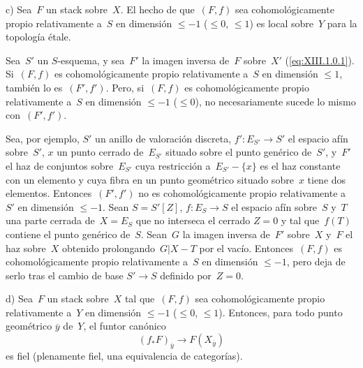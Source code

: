 \begin{remarques}
c) Sea~$F$ un stack sobre~$X$. El hecho de que~$(F,f)$ sea
cohomológicamente propio relativamente a~$S$ en dimensión
$\leqslant -1$ (\resp $\leqslant 0$, \resp $\leqslant 1$) es local
sobre~$Y$ para la topología étale.

Sea~$S'$ un $S$-esquema, y sea~$F'$ la imagen inversa de~$F$ sobre~$X'$
(\cf \eqref{eq:XIII.1.0.1}). Si~$(F,f)$ es cohomológicamente propio
relativamente a~$S$ en dimensión $\leqslant 1$, también lo es~$(F',f')$.
Pero, si~$(F,f)$ es cohomológicamente propio relativamente a~$S$ en
dimensión $\leqslant -1$ (\resp $\leqslant 0$), no necesariamente sucede
lo mismo con~$(F',f')$.

Sea, por ejemplo, $S'$ un anillo de valoración discreta,
$f'\colon E_{S'}\to S'$ el espacio afín sobre~$S'$, $x$ un punto cerrado
de~$E_{S'}$ situado sobre el punto genérico de~$S'$, y~$F'$ el haz de
conjuntos sobre~$E_{S'}$ cuya restricción a~$E_{S'}-\{x\}$ es el haz
constante con un elemento y cuya fibra en un punto geométrico situado
sobre~$x$ tiene dos elementos. Entonces~$(F',f')$ no es
cohomológicamente propio relativamente a~$S'$ en dimensión
$\leqslant -1$. Sean $S=S'[Z]$, $f\colon E_S\to S$ el espacio afín
sobre~$S$ y~$T$ una parte cerrada de~$X=E_S$ que no interseca el cerrado
$Z=0$ y tal que~$f(T)$ contiene el punto genérico de~$S$.
Sean~$G$ la imagen inversa de~$F'$ sobre~$X$ y~$F$ el haz sobre~$X$
obtenido prolongando~$G|X-T$ por el vacío. Entonces~$(F,f)$ es
cohomológicamente propio relativamente a~$S$ en dimensión
$\leqslant -1$, pero deja de serlo tras el cambio de base $S'\to S$
definido por~$Z=0$.

d)
Sea~$F$ un stack sobre~$X$ tal que~$(F,f)$ sea cohomológicamente propio
relativamente a~$Y$ en dimensión $\leqslant -1$ (\resp $\leqslant 0$,
\resp $\leqslant 1$). Entonces, para todo punto geométrico
$\overline{y}$ de~$Y$, el funtor canónico
$$
(f_*F)_{\overline{y}}\to F(X_{\overline{y}})
$$
es fiel (\resp plenamente fiel, \resp una equivalencia de categorías).
\end{remarques}
